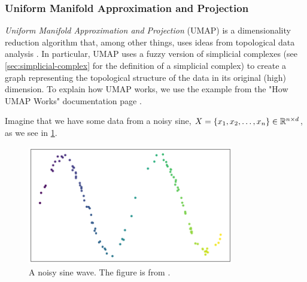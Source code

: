 \subsubsection{Uniform Manifold Approximation and Projection}
\label{sec:umap}
\textit{Uniform Manifold Approximation and Projection} (UMAP) is a dimensionality reduction algorithm that, among other things, uses ideas from topological data analysis \cite{2018arXivUMAP}. In particular, UMAP uses a fuzzy version of simplicial complexes (see \cref{sec:simplicial-complex} for the definition of a simplicial complex) to create a graph representing the topological structure of the data in its original (high) dimension. To explain how UMAP works, we use the example from the "How UMAP Works" documentation page \cite{how-umap-works-2018}.

Imagine that we have some data from a noisy sine, $X = \left\{x_1, x_2, \ldots, x_n\right\} \in \mathbb{R}^{n \times d}$, as we see in \cref{fig:how_umap_works_raw_data}.
\begin{figure}[H]
    \centering
    \includegraphics[width=0.8\textwidth]{thesis/figures/how_umap_works_raw_data.png}
    \caption{A noisy sine wave. The figure is from \cite{how-umap-works-2018}.}
    \label{fig:how_umap_works_raw_data}
\end{figure}

